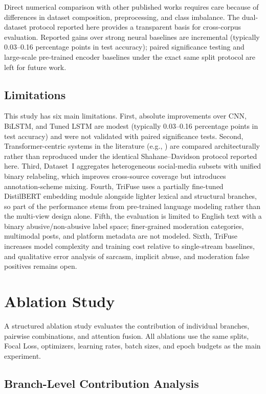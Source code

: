 Direct numerical comparison with other published works requires care because of differences in dataset composition, preprocessing, and class imbalance. The dual-dataset protocol reported here provides a transparent basis for cross-corpus evaluation. Reported gains over strong neural baselines are incremental (typically 0.03--0.16 percentage points in test accuracy); paired significance testing and large-scale pre-trained encoder baselines under the exact same split protocol are left for future work.

\subsection{Limitations}

This study has six main limitations. First, absolute improvements over CNN, BiLSTM, and Tuned LSTM are modest (typically 0.03--0.16 percentage points in test accuracy) and were not validated with paired significance tests. Second, Transformer-centric systems in the literature (e.g., \cite{ref14, ref15, ref16}) are compared architecturally rather than reproduced under the identical Shahane--Davidson protocol reported here. Third, Dataset~I aggregates heterogeneous social-media subsets with unified binary relabeling, which improves cross-source coverage but introduces annotation-scheme mixing. Fourth, TriFuse uses a partially fine-tuned DistilBERT embedding module alongside lighter lexical and structural branches, so part of the performance stems from pre-trained language modeling rather than the multi-view design alone. Fifth, the evaluation is limited to English text with a binary abusive/non-abusive label space; finer-grained moderation categories, multimodal posts, and platform metadata are not modeled. Sixth, TriFuse increases model complexity and training cost relative to single-stream baselines, and qualitative error analysis of sarcasm, implicit abuse, and moderation false positives remains open.

\section{Ablation Study}

A structured ablation study evaluates the contribution of individual branches, pairwise combinations, and attention fusion. All ablations use the same splits, Focal Loss, optimizers, learning rates, batch sizes, and epoch budgets as the main experiment.

\subsection{Branch-Level Contribution Analysis}

